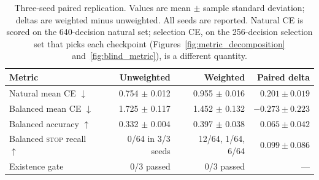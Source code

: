 %
\begin{table}[t]
\centering
\small
\caption{Three-seed paired replication. Values are mean $\pm$ sample standard deviation; deltas are weighted minus unweighted. All seeds are reported. Natural CE is scored on the 640-decision natural set; selection CE, on the 256-decision selection set that picks each checkpoint (Figures~\ref{fig:metric_decomposition} and~\ref{fig:blind_metric}), is a different quantity.}
\label{tab:seed-replication}
\begin{tabular}{@{}lrrr@{}}
\toprule
Metric & Unweighted & Weighted & Paired delta \\
\midrule
Natural mean CE $\downarrow$ & 0.754 $\pm$ 0.012 & 0.955 $\pm$ 0.016 & $0.201 \pm 0.019$ \\
Balanced mean CE $\downarrow$ & 1.725 $\pm$ 0.117 & 1.452 $\pm$ 0.132 & $-0.273 \pm 0.223$ \\
Balanced accuracy $\uparrow$ & 0.332 $\pm$ 0.004 & 0.397 $\pm$ 0.038 & $0.065 \pm 0.042$ \\
Balanced \textsc{stop} recall $\uparrow$ & 0/64 in 3/3 seeds & 12/64, 1/64, 6/64 & $0.099 \pm 0.086$ \\
Existence gate & 0/3 passed & 0/3 passed & --- \\
\bottomrule
\end{tabular}
\end{table}
